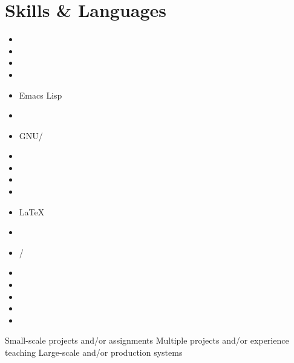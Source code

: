 \documentclass[10pt]{article}
\begin{document}
\newcommand{\skills}[2]{
  \item #2 #1
}


\section{Skills \& Languages}
\vspace{-1em}
\begin{multicols}{4}
\raggedcolumns
\begin{itemize}
\renewcommand{\labelitemi}{}
\renewcommand{\skill}{\textnormal}
\setlength{\itemsep}{1pt}
\setlength{\parskip}{0pt}
\setlength{\parsep}{0pt}

\skills{\bash}{\threeskill}
\skills{\ccpp}{\threeskill}
\skills{\cascalog}{\oneskill}
\skills{\clojure}{\threeskill}
\skills{Emacs Lisp}{\twoskill}
\skills{\git}{\twoskill}
\skills{GNU/\linux}{\threeskill}
\skills{\hadoop}{\twoskill}
\skills{\haskell}{\oneskill}
\skills{\java}{\threeskill}
\skills{\js}{\twoskill}
\skills{\LaTeX}{\twoskill}
\skills{\matlab}{\threeskill}
\skills{\numpy/\scipy}{\threeskill}
\skills{\opencv}{\threeskill}
\skills{\python}{\threeskill}
\skills{\django}{\twoskill}
\skills{\scheme}{\threeskill}
\skills{\sql}{\twoskill}

\end{itemize}
\end{multicols}


\begin{footnotesize}
  \oneskill Small-scale projects and/or assignments \hfill
  \twoskill Multiple projects and/or experience teaching \hfill
  \threeskill Large-scale and/or production systems
\end{footnotesize}

\newcommand{\proj}[3]{
  \textsc{#1} & #2\\
   &\href{http://www.#3}{#3}\\
   \multicolumn{2}{c}{} \\ [-1ex]
}
\end{document}
